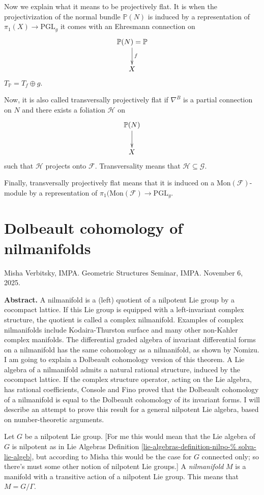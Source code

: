 \medskip\noindent
Now we explain what it means to be
projectively flat.
It is when the projectivization of the normal
bundle $\mathbb{P}(N)$
is induced by a representation of $\pi_1(X)
\to \text{PGL}_g$
it comes with an Ehresmann connection on
$$
\xymatrix{
\mathbb{P}(N)=\mathbb{P}\ar[d]^{f}\\
X
}
$$
$T_{\mathbb{P}}=T_f \oplus g$.

Now, it is also called transversally
projectively flat
if $\nabla^B$ is a partial connection on $N$
and there exists a foliation $\mathcal{H}$ on
$$
\xymatrix{
\mathbb{P}(N)\ar[d]\\ X
}
$$
such that $\mathcal{H}$ projects onto
$\mathcal{F}$.
Transversality means that $\mathcal{H}
\subseteq \mathcal{G}$.

Finally, transversally projectively flat
means that
it is induced on a
$\text{Mon}(\mathcal{F})$-module
by a representation of
$\pi_1(\text{Mon}(\mathcal{F}) \to
\text{PGL}_g$.


\section{Dolbeault cohomology of
nilmanifolds}
\label{section-dolbe-cohom-nilma}

\noindent
Misha Verbitsky, IMPA.
Geometric Structures Seminar, IMPA.
November 6, 2025.

\medskip\noindent
{\bf Abstract.}
A nilmanifold is a (left) quotient of a
nilpotent Lie group by a cocompact
lattice. If this Lie group is equipped with a
left-invariant complex structure,
the quotient is called a complex nilmanifold.
Examples of complex nilmanifolds
include Kodaira-Thurston surface and many
other non-Kahler complex manifolds.
The differential graded algebra of invariant
differential forms on a nilmanifold
has the same cohomology as a nilmanifold, as
shown by Nomizu. I am going to
explain a Dolbeault cohomology version of
this theorem. A Lie algebra of a
nilmanifold admits a natural rational
structure, induced by the cocompact
lattice. If the complex structure operator,
acting on the Lie algebra, has
rational coefficients, Console and Fino
proved that the Dolbeault cohomology of
a nilmanifold is equal to the Dolbeault
cohomology of its invariant forms. I
will describe an attempt to prove this result
for a general nilpotent Lie
algebra, based on number-theoretic arguments.

\medskip\noindent
Let $G$ be a nilpotent Lie group.
[For me this would mean that the Lie algebra
of $G$ is
nilpotent as in Lie Algebras Definition
\ref{lie-algebras-definition-nilpo-%
solva-lie-algeb},
but according to Misha this would be the case
for $G$
connected only; so there's must some other
notion
of nilpotent Lie groups.]
A {\it nilmanifold} $M$ is a manifold with a
transitive action
of a nilpotent Lie group. This means that
$M=G/\Gamma$.

